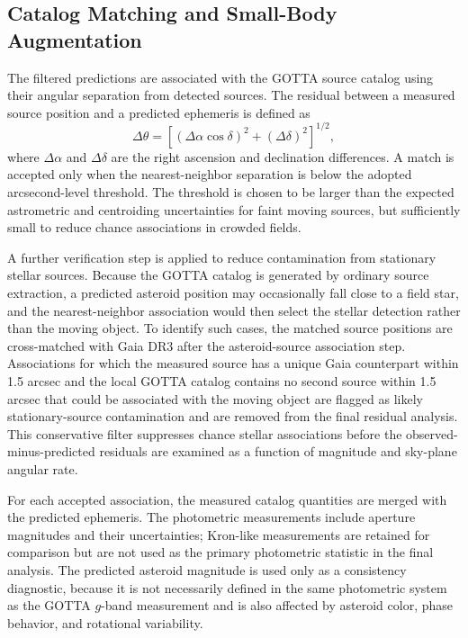 \documentclass[referee]{raa}
\begin{document}
\subsection{Catalog Matching and Small-Body Augmentation}

The filtered predictions are associated with the GOTTA source catalog using their angular separation from detected sources. The residual between a measured source position and a predicted ephemeris is defined as
\begin{equation}
\Delta\theta =
\left[
(\Delta\alpha\cos\delta)^2 + (\Delta\delta)^2
\right]^{1/2},
\end{equation}
where $\Delta\alpha$ and $\Delta\delta$ are the right ascension and declination differences. A match is accepted only when the nearest-neighbor separation is below the adopted arcsecond-level threshold. The threshold is chosen to be larger than the expected astrometric and centroiding uncertainties for faint moving sources, but sufficiently small to reduce chance associations in crowded fields.

A further verification step is applied to reduce contamination from stationary stellar sources. Because the GOTTA catalog is generated by ordinary source extraction, a predicted asteroid position may occasionally fall close to a field star, and the nearest-neighbor association would then select the stellar detection rather than the moving object. To identify such cases, the matched source positions are cross-matched with Gaia DR3 \citep{Gaia2023} after the asteroid-source association step. Associations for which the measured source has a unique Gaia counterpart within 1.5 arcsec and the local GOTTA catalog contains no second source within 1.5 arcsec that could be associated with the moving object are flagged as likely stationary-source contamination and are removed from the final residual analysis. This conservative filter suppresses chance stellar associations before the observed-minus-predicted residuals are examined as a function of magnitude and sky-plane angular rate.

For each accepted association, the measured catalog quantities are merged with the predicted ephemeris. The photometric measurements include aperture magnitudes and their uncertainties; Kron-like measurements are retained for comparison but are not used as the primary photometric statistic in the final analysis. The predicted asteroid magnitude is used only as a consistency diagnostic, because it is not necessarily defined in the same photometric system as the GOTTA $g$-band measurement and is also affected by asteroid color, phase behavior, and rotational variability.
\end{document}
